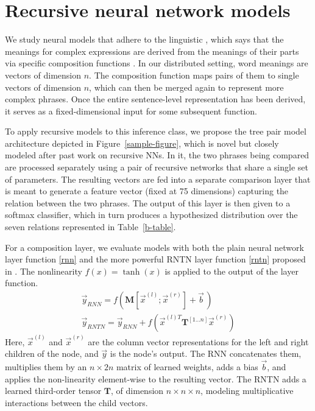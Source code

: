 
\section{Recursive neural network models} \label{methods}

We study neural models that adhere to the linguistic , which says that the meanings for complex
expressions are derived from the meanings of their parts
via specific composition functions \cite{Partee84,Janssen97}. In our
distributed setting, word meanings are vectors of dimension $n$. The
composition function maps pairs of them to single vectors of dimension $n$, 
which can then be merged again to represent more complex
phrases. Once the entire sentence-level representation has been
derived, it serves as a fixed-dimensional input for some subsequent function.

To apply recursive models to this inference class, we propose the tree 
pair model architecture depicted in Figure~\ref{sample-figure}, which is novel but
closely modeled after past work on recursive NNs. 
In it, the two phrases being compared are processed separately using a pair 
of recursive networks that share a single set of parameters. 
The resulting vectors are fed into a separate comparison
layer that is meant to generate a feature vector (fixed at 75 dimensions) capturing the
relation between the two phrases. The output of this layer is then
given to a softmax classifier, which in turn produces a hypothesized
distribution over the seven relations represented in Table~\ref{b-table}.

For a composition layer, we evaluate models with both the plain neural
network layer function \eqref{rnn} and the more powerful RNTN layer function
\eqref{rntn} proposed in . The nonlinearity $f(x) = \tanh(x)$ is applied to the output of the layer function.
%
\begin{gather} \label{rnn}
\vec{y}_{\textit{RNN}} = f(\mathbf{M} [\vec{x}^{(l)}; \vec{x}^{(r)}] + \vec{b}\,) \\
\label{rntn}
\vec{y}_{\textit{RNTN}} = \vec{y}_{\textit{RNN}} + f(\vec{x}^{(l)T} \mathbf{T}^{[1 \ldots n]} \vec{x}^{(r)})
\end{gather} 
%
Here, $\vec{x}^{(l)}$ and $\vec{x}^{(r)}$ are the column vector
representations for the left and right children of the node, and
$\vec{y}$ is the node's output.  The RNN concatenates them, multiplies
them by an $n \times 2n$ matrix of learned weights, adds a bias $\vec{b}$, and applies the
non-linearity element-wise to the resulting vector. The RNTN adds a learned third-order tensor 
$\mathbf{T}$, of dimension $n \times n \times n$, modeling
multiplicative interactions between the child vectors.

